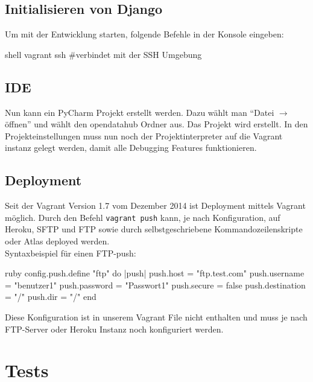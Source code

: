 \subsection{Initialisieren von Django}
Um mit der Entwicklung starten, folgende Befehle in der Konsole eingeben:
\begin{src}{shell}
vagrant ssh #verbindet mit der SSH Umgebung
\end{src}
\subsection{IDE}
Nun kann ein PyCharm Projekt erstellt werden. Dazu wählt man ``Datei $\to$ öffnen'' und wählt den opendatahub Ordner aus. Das Projekt wird erstellt. In den Projekteinstellungen muss nun noch der Projektinterpreter auf die Vagrant instanz gelegt werden, damit alle Debugging Features funktionieren.
\subsection{Deployment}
Seit der Vagrant Version 1.7 vom Dezember 2014 ist Deployment mittels Vagrant möglich. Durch den Befehl \texttt{vagrant push} kann, je nach Konfiguration, auf Heroku, SFTP und FTP sowie durch selbstgeschriebene Kommandozeilenskripte oder Atlas deployed werden.
\\Syntaxbeispiel für einen FTP-push: \cite{vagrant-deployment}
\begin{src}{ruby}
config.push.define "ftp" do |push|
  push.host = "ftp.test.com"
  push.username = "benutzer1"
  push.password = "Passwort1"
  push.secure = false
  push.destination = "/"
  push.dir = "/"
end
\end{src}
Diese Konfiguration ist in unserem Vagrant File nicht enthalten und muss je nach FTP-Server oder Heroku Instanz noch konfiguriert werden.
\section{Tests}
